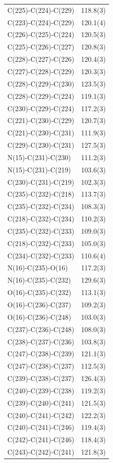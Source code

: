 \begin{center}
{\begin{supertabular}{p{1.5in}c}
C(225)-C(224)-C(229)&118.8(3)\\
C(223)-C(224)-C(229)&120.1(4)\\
C(226)-C(225)-C(224)&120.5(3)\\
C(225)-C(226)-C(227)&120.8(3)\\
C(228)-C(227)-C(226)&120.4(3)\\
C(227)-C(228)-C(229)&120.3(3)\\
C(228)-C(229)-C(230)&123.5(3)\\
C(228)-C(229)-C(224)&119.1(3)\\
C(230)-C(229)-C(224)&117.2(3)\\
C(221)-C(230)-C(229)&120.7(3)\\
C(221)-C(230)-C(231)&111.9(3)\\
C(229)-C(230)-C(231)&127.5(3)\\
N(15)-C(231)-C(230)&111.2(3)\\
N(15)-C(231)-C(219)&103.6(3)\\
C(230)-C(231)-C(219)&102.3(3)\\
C(235)-C(232)-C(218)&113.7(3)\\
C(235)-C(232)-C(234)&108.3(3)\\
C(218)-C(232)-C(234)&110.2(3)\\
C(235)-C(232)-C(233)&109.0(3)\\
C(218)-C(232)-C(233)&105.0(3)\\
C(234)-C(232)-C(233)&110.6(4)\\
N(16)-C(235)-O(16)&117.2(3)\\
N(16)-C(235)-C(232)&129.6(3)\\
O(16)-C(235)-C(232)&113.1(3)\\
O(16)-C(236)-C(237)&109.2(3)\\
O(16)-C(236)-C(248)&103.0(3)\\
C(237)-C(236)-C(248)&108.0(3)\\
C(238)-C(237)-C(236)&103.8(3)\\
C(247)-C(238)-C(239)&121.1(3)\\
C(247)-C(238)-C(237)&112.5(3)\\
C(239)-C(238)-C(237)&126.4(3)\\
C(240)-C(239)-C(238)&119.2(3)\\
C(239)-C(240)-C(241)&121.5(3)\\
C(240)-C(241)-C(242)&122.2(3)\\
C(240)-C(241)-C(246)&119.4(3)\\
C(242)-C(241)-C(246)&118.4(3)\\
C(243)-C(242)-C(241)&121.8(3)\\

\end{supertabular}}
\end{center}
